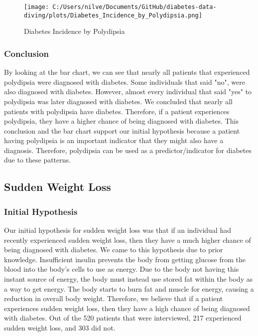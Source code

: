 \documentclass[
]{article}
\begin{document}
\begin{figure}
\centering
\texttt{[image: C:/Users/nilve/Documents/GitHub/diabetes-data-diving/plots/Diabetes\_Incidence\_by\_Polydipsia.png]}
\caption{Diabetes Incidence by Polydipsia}
\end{figure}

\hypertarget{header-n890}{%
\subsubsection{Conclusion}\label{header-n890}}

By looking at the bar chart, we can see that nearly all patients that
experienced polydipsia were diagnosed with diabetes. Some individuals
that said "no", were also diagnosed with diabetes. However, almost every
individual that said "yes" to polydipsia was later diagnosed with
diabetes. We concluded that nearly all patients with polydipsia have
diabetes. Therefore, if a patient experiences polydipsia, they have a
higher chance of being diagnosed with diabetes. This conclusion and the
bar chart support our initial hypothesis because a patient having
polydipsia is an important indicator that they might also have a
diagnosis. Therefore, polydipsia can be used as a predictor/indicator
for diabetes due to these patterns.

\hypertarget{header-n892}{%
\subsection{Sudden Weight Loss}\label{header-n892}}

\hypertarget{header-n893}{%
\subsubsection{Initial Hypothesis}\label{header-n893}}

Our initial hypothesis for sudden weight loss was that if an individual
had recently experienced sudden weight loss, then they have a much
higher chance of being diagnosed with diabetes. We came to this
hypothesis due to prior knowledge. Insufficient insulin prevents the
body from getting glucose from the blood into the body's cells to use as
energy. Due to the body not having this instant source of energy, the
body must instead use stored fat within the body as a way to get energy.
The body starts to burn fat and muscle for energy, causing a reduction
in overall body weight. Therefore, we believe that if a patient
experiences sudden weight loss, then they have a high chance of being
diagnosed with diabetes. Out of the 520 patients that were interviewed,
217 experienced sudden weight loss, and 303 did not.
\end{document}
